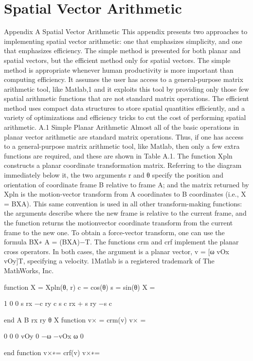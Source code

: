 \appendix
\chapter{Spatial Vector Arithmetic}
Appendix A Spatial Vector Arithmetic This appendix presents two approaches to implementing spatial vector arithmetic: one that emphasizes simplicity, and one that emphasizes efficiency. The simple method is presented for both planar and spatial vectors, but the efficient method only for spatial vectors. The simple method is appropriate whenever human productivity is more important than computing efficiency. It assumes the user has access to a general-purpose matrix arithmetic tool, like Matlab,1 and it exploits this tool by providing only those few spatial arithmetic functions that are not standard matrix operations. The efficient method uses compact data structures to store spatial quantities efficiently, and a variety of optimizations and efficiency tricks to cut the cost of performing spatial arithmetic. A.1 Simple Planar Arithmetic Almost all of the basic operations in planar vector arithmetic are standard matrix operations. Thus, if one has access to a general-purpose matrix arithmetic tool, like Matlab, then only a few extra functions are required, and these are shown in Table A.1. The function Xpln constructs a planar coordinate transformation matrix. Referring to the diagram immediately below it, the two arguments r and θ specify the position and orientation of coordinate frame B relative to frame A; and the matrix returned by Xpln is the motion-vector transform from A coordinates to B coordinates (i.e., X = BXA). This same convention is used in all other transform-making functions: the arguments describe where the new frame is relative to the current frame, and the function returns the motionvector coordinate transform from the current frame to the new one. To obtain a force-vector transform, one can use the formula BX∗ A = (BXA)−T. The functions crm and crf implement the planar cross operators. In both cases, the argument is a planar vector, v = [ω vOx vOy]T, specifying a velocity. 1Matlab is a registered trademark of The MathWorks, Inc.

function X = Xpln(θ, r) c = cos(θ) s = sin(θ) X =

1 0 0 s rx −c ry c s c rx + s ry −s c

end A B rx ry θ X function v× = crm(v) v× =

0 0 0 vOy 0 −ω −vOx ω 0

end function v×∗= crf(v) v×∗=

